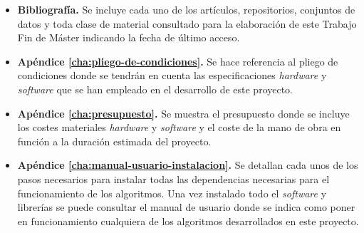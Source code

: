 \begin{itemize}
    \item \textbf{Bibliografía.} Se incluye cada uno de los artículos, repositorios, conjuntos de datos y toda clase de material consultado para la elaboración de este Trabajo Fin de Máster indicando la fecha de último acceso. 
    \item \textbf{Apéndice \ref{cha:pliego-de-condiciones}.} Se hace referencia al pliego de condiciones donde se tendrán en cuenta las especificaciones \textit{hardware} y \textit{software} que se han empleado en el desarrollo de este proyecto.
    \item \textbf{Apéndice \ref{cha:presupuesto}.} Se muestra el presupuesto donde se incluye los costes materiales \textit{hardware} y \textit{software} y el coste de la mano de obra en función a la duración estimada del proyecto.
    \item \textbf{Apéndice \ref{cha:manual-usuario-instalacion}.} Se detallan cada unos de los pasos necesarios para instalar todas las dependencias necesarias para el funcionamiento de los algoritmos. Una vez instalado todo el \textit{software} y librerías se puede consultar el manual de usuario donde se indica como poner en funcionamiento cualquiera de los algoritmos desarrollados en este proyecto.
\end{itemize}




